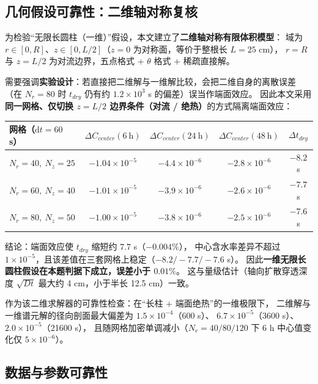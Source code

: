 \documentclass[12pt,a4paper]{ctexart}
\newcommand{\ud}{\mathrm{d}}
\begin{document}
\subsection{几何假设可靠性：二维轴对称复核}

为检验“无限长圆柱（一维）”假设，本文建立了\textbf{二维轴对称有限体积模型}：
域为 $r\in[0,R]$、$z\in[0,L/2]$（$z=0$ 为对称面，等价于整根长 $L=25$ cm），
$r=R$ 与 $z=L/2$ 为对流边界，五点格式 + $\theta$ 格式 + 稀疏直接解。

需要强调\textbf{实验设计}：若直接把二维解与一维解比较，会把二维自身的离散误差
（在 $N_r=80$ 时 $t_{dry}$ 仍有约 $1.2\times10^3$ s 的偏差）误当作端面效应。
因此本文采用\textbf{同一网格、仅切换 $z=L/2$ 边界条件（对流 / 绝热）}的方式隔离端面效应：

\begin{center}
\small
\begin{tabular}{@{}lcccc@{}}
\toprule
网格（$\ud t=60$ s） & $\Delta C_{center}(6\ \text{h})$ & $\Delta C_{center}(24\ \text{h})$
& $\Delta C_{center}(48\ \text{h})$ & $\Delta t_{dry}$ \\
\midrule
$N_r=40,\ N_z=25$ & $-1.04\times10^{-5}$ & $-4.4\times10^{-6}$ & $-2.8\times10^{-6}$ & $-8.2$ s \\
$N_r=60,\ N_z=40$ & $-1.01\times10^{-5}$ & $-3.9\times10^{-6}$ & $-2.6\times10^{-6}$ & $-7.7$ s \\
$N_r=80,\ N_z=50$ & $-1.00\times10^{-5}$ & $-3.8\times10^{-6}$ & $-2.5\times10^{-6}$ & $-7.6$ s \\
\bottomrule
\end{tabular}
\end{center}

\noindent 结论：端面效应使 $t_{dry}$ 缩短约 $7.7$ s（$\mathbf{-0.004\%}$），
中心含水率差异不超过 $1\times10^{-5}$，且该差值在三套网格上稳定（$-8.2/-7.7/-7.6$ s）。
因此\textbf{一维无限长圆柱假设在本题判据下成立，误差小于 $0.01\%$}。
这与量级估计（轴向扩散穿透深度 $\sqrt{Dt}$ 最大约 4 cm，小于半长 12.5 cm）一致。

作为该二维求解器的可靠性检查：在“长柱 + 端面绝热”的一维极限下，
二维解与一维谱元解的径向剖面最大偏差为 $1.5\times10^{-4}$（600 s）、
$6.7\times10^{-5}$（3600 s）、$2.0\times10^{-5}$（21600 s），
且随网格加密单调减小（$N_r=40/80/120$ 下 6 h 中心值变化仅 $5\times10^{-6}$）。

\subsection{数据与参数可靠性}
\end{document}

